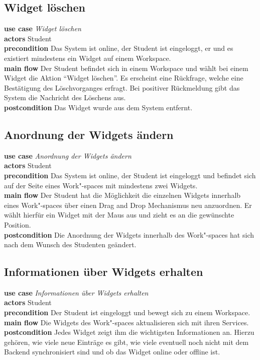 \subsection{Widget löschen}
\textbf{use case} \emph{Widget löschen}\\
\textbf{actors} Student\\
\textbf{precondition} Das System ist online, der Student ist eingeloggt, er und es existiert mindestens ein Widget auf einem Workspace.\\
\textbf{main flow} Der Student befindet sich in einem Workspace und wählt bei einem Widget die Aktion "`Widget löschen"'. Es erscheint eine Rückfrage, welche eine Bestätigung des Löschvorganges erfragt. Bei positiver Rückmeldung gibt das System die Nachricht des Löschens aus.\\
\textbf{postcondition} Das Widget wurde aus dem System entfernt.
 
\subsection{Anordnung der Widgets ändern}
\textbf{use case} \emph{Anordnung der Widgets ändern}\\
\textbf{actors} Student\\
\textbf{precondition} Das System ist online, der Student ist eingeloggt und befindet sich auf der Seite eines Work"-spaces mit mindestens zwei Widgets.\\
\textbf{main flow} Der Student hat die Möglichkeit die einzelnen Widgets innerhalb eines Work"-spaces über einen Drag and Drop Mechanismus neu anzuordnen. Er wählt hierfür ein Widget mit der Maus aus und zieht es an die gewünschte Position.\\
\textbf{postcondition} Die Anordnung der Widgets innerhalb des Work"-spaces hat sich nach dem Wunsch des Studenten geändert.
 
\subsection{Informationen über Widgets erhalten}
\textbf{use case} \emph{Informationen über Widgets erhalten}\\
\textbf{actors} Student\\
\textbf{precondition} Der Student ist eingeloggt und bewegt sich zu einem Workspace.\\
\textbf{main flow} Die Widgets des Work"-spaces aktualisieren sich mit ihren Services. \\
\textbf{postcondition} Jedes Widget zeigt ihm die wichtigsten Informationen an. Hierzu gehören, wie viele neue Einträge es gibt, wie viele eventuell noch nicht mit dem Backend synchronisiert sind und ob das Widget online oder offline ist.
 
